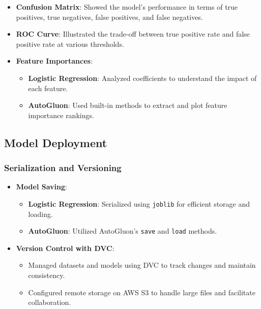 \documentclass{article}
\begin{document}
\begin{itemize}[leftmargin=*]
    \item \textbf{Confusion Matrix}: Showed the model's performance in terms of true positives, true negatives, false positives, and false negatives.
    \item \textbf{ROC Curve}: Illustrated the trade-off between true positive rate and false positive rate at various thresholds.
    \item \textbf{Feature Importances}:
        \begin{itemize}[leftmargin=*]
            \item \textbf{Logistic Regression}: Analyzed coefficients to understand the impact of each feature.
            \item \textbf{AutoGluon}: Used built-in methods to extract and plot feature importance rankings.
        \end{itemize}
\end{itemize}



\subsection{Model Deployment}

\subsubsection{Serialization and Versioning}

\begin{itemize}[leftmargin=*]
    \item \textbf{Model Saving}:
        \begin{itemize}[leftmargin=*]
            \item \textbf{Logistic Regression}: Serialized using \texttt{joblib} for efficient storage and loading.
            \item \textbf{AutoGluon}: Utilized AutoGluon's \texttt{save} and \texttt{load} methods.
        \end{itemize}
    \item \textbf{Version Control with DVC}:
        \begin{itemize}[leftmargin=*]
            \item Managed datasets and models using DVC to track changes and maintain consistency.
            \item Configured remote storage on AWS S3 to handle large files and facilitate collaboration.
        \end{itemize}
\end{itemize}
\end{document}
